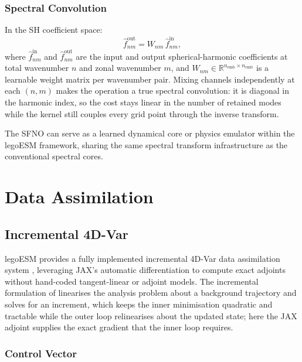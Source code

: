 \documentclass[11pt,twoside]{report}
\begin{document}
\subsection{Spectral Convolution}

In the SH coefficient space:
\begin{equation}
  \hat f_{nm}^{\mathrm{out}} = W_{nm}\,\hat f_{nm}^{\mathrm{in}},
\end{equation}
where $\hat f_{nm}^{\mathrm{in}}$ and $\hat f_{nm}^{\mathrm{out}}$ are the input
and output spherical-harmonic coefficients at total wavenumber $n$ and zonal
wavenumber $m$, and $W_{nm}\in\mathbb{R}^{n_{\mathrm{emb}}\times n_{\mathrm{emb}}}$
is a learnable weight matrix per wavenumber pair.  Mixing channels independently
at each $(n,m)$ makes the operation a true spectral convolution: it is diagonal
in the harmonic index, so the cost stays linear in the number of retained modes
while the kernel still couples every grid point through the inverse transform.

The SFNO can serve as a learned dynamical core or physics emulator within
the legoESM framework, sharing the same spectral transform infrastructure
as the conventional spectral cores.


\chapter{Data Assimilation}
\label{ch:da}

\section{Incremental 4D-Var}

legoESM provides a fully implemented incremental 4D-Var data assimilation
system \citep{Courtier1994,Rabier2000}, leveraging JAX's automatic
differentiation to compute exact adjoints without hand-coded tangent-linear or
adjoint models.  The incremental formulation of \citet{Courtier1994} linearises
the analysis problem about a background trajectory and solves for an increment,
which keeps the inner minimisation quadratic and tractable while the outer loop
relinearises about the updated state; here the JAX adjoint supplies the exact
gradient that the inner loop requires.

\subsection{Control Vector}
\end{document}

